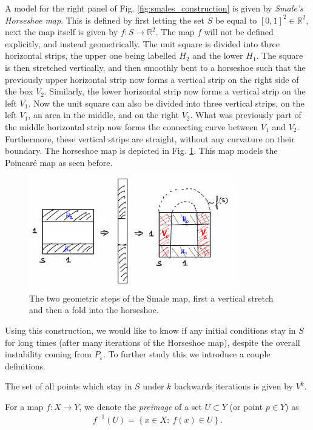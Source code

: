 A model for the right panel of Fig. \ref{fig:smales_construction} is given by \emph{Smale's Horseshoe map}. This is defined by first letting the set $S$ be equal to $[0,1]^2\in \mathbb{R}^{2}$, next the map itself is given by $f:S\to\mathbb{R}^{2}$. The map $f$ will not be defined explicitly, and instead geometrically. The unit square is divided into three horizontal strips, the upper one being labelled $H_2$ and the lower $H_1$. The square is then stretched vertically, and then smoothly bent to a horseshoe such that the previously upper horizontal strip now forms a vertical strip on the right side of the box $V_2$. Similarly, the lower horizontal strip now forms a vertical strip on the left $V_1$. Now the unit square can also be divided into three vertical strips, on the left $V_1$, an area in the middle, and on the right $V_2$. What was previously part of the middle horizontal strip now forms the connecting curve between $V_1$ and $V_2$. Furthermore, these vertical strips are straight, without any curvature on their boundary. The horseshoe map is depicted in Fig. \ref{fig:smale_map}. This map models the Poincaré map as seen before.
\begin{figure}[h!]
	\centering
	\includegraphics[width=0.8\textwidth]{figures/ch6/17smale_map.png}
	\caption{The two geometric steps of the Smale map, first a vertical stretch and then a fold into the horseshoe.}
	\label{fig:smale_map}
\end{figure}

Using this construction, we would like to know if any initial conditions stay in $S$ for long times (after many iterations of the Horseshoe map), despite the overall instability coming from $P_{\varepsilon}$. To further study this we introduce a couple definitions.
\begin{definition}
	The set of all points which stay in $S$ under $k$ backwards iterations is given by $V^{k}$.
\end{definition}
\begin{definition}[]
	For a map $f:X \to Y$, we denote the \emph{preimage} of a set $U\subset Y$ (or point $p\in Y$) as
	\begin{align}
		\boxed{
			f^{-1}(U) = \left\{ x\in X:\ f(x) \in U\right\}.
		}
	\end{align}
\end{definition}

